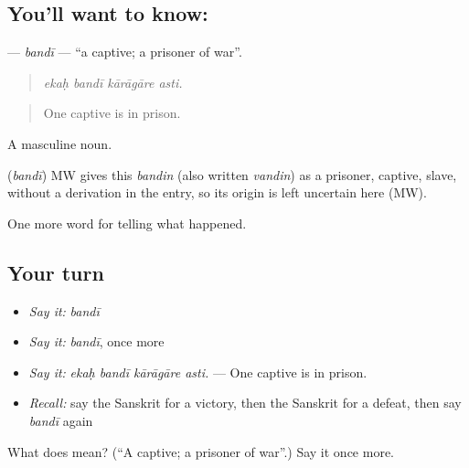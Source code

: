 \subsection*{You'll want to know: }
\textbf{} — \emph{bandī} — \textquotedblleft{}a captive; a prisoner of war\textquotedblright{}.

\begin{quote}
   
\end{quote}

\begin{quote}
\emph{ekaḥ bandī kārāgāre asti.}
\end{quote}

\begin{quote}
One captive is in prison.
\end{quote}

A masculine noun.

\begin{cousinweb}
\textbf{} (\emph{bandī}) MW gives this \emph{bandin} (also written \emph{vandin}) as a prisoner, captive, slave, without a derivation in the entry, so its origin is left uncertain here (MW).
\end{cousinweb}

\begin{grammarlens}[title={What you've built}]
One more word for telling what happened.
\end{grammarlens}

\subsection*{Your turn}
\begin{itemize}
\raggedright
  \item \emph{Say it:} \emph{bandī}
  \item \emph{Say it:} \emph{bandī}, once more
  \item \emph{Say it:} \emph{ekaḥ bandī kārāgāre asti.} — One captive is in prison.
  \item \emph{Recall:} say the Sanskrit for a victory, then the Sanskrit for a defeat, then say \emph{bandī} again
\end{itemize}

\begin{tcolorbox}[breakable,colback=teal!4,colframe=teal!35!black,title={Before you move on}]
What does  mean? (\textquotedblleft{}A captive; a prisoner of war\textquotedblright{}.) Say it once more.
\end{tcolorbox}
